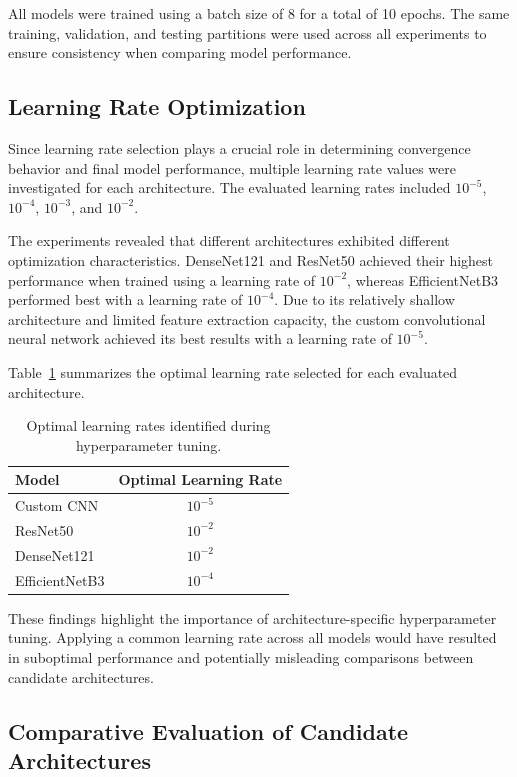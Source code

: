 All models were trained using a batch size of 8 for a total of 10 epochs. The same training, validation, and testing partitions were used across all experiments to ensure consistency when comparing model performance.

\subsection{Learning Rate Optimization}

Since learning rate selection plays a crucial role in determining convergence behavior and final model performance, multiple learning rate values were investigated for each architecture. The evaluated learning rates included \(10^{-5}\), \(10^{-4}\), \(10^{-3}\), and \(10^{-2}\).

The experiments revealed that different architectures exhibited different optimization characteristics. DenseNet121 and ResNet50 achieved their highest performance when trained using a learning rate of \(10^{-2}\), whereas EfficientNetB3 performed best with a learning rate of \(10^{-4}\). Due to its relatively shallow architecture and limited feature extraction capacity, the custom convolutional neural network achieved its best results with a learning rate of \(10^{-5}\).

Table~\ref{tab:learning_rates} summarizes the optimal learning rate selected for each evaluated architecture.

\begin{table}[H]
	\centering
	\caption{Optimal learning rates identified during hyperparameter tuning.}
	\label{tab:learning_rates}
	\begin{tabular}{|l|c|}
		\hline
		\textbf{Model} & \textbf{Optimal Learning Rate} \\
		\hline
		Custom CNN & $10^{-5}$ \\
		\hline
		ResNet50 & $10^{-2}$ \\
		\hline
		DenseNet121 & $10^{-2}$ \\
		\hline
		EfficientNetB3 & $10^{-4}$ \\
		\hline
	\end{tabular}
\end{table}

These findings highlight the importance of architecture-specific hyperparameter tuning. Applying a common learning rate across all models would have resulted in suboptimal performance and potentially misleading comparisons between candidate architectures.

\subsection{Comparative Evaluation of Candidate Architectures}

